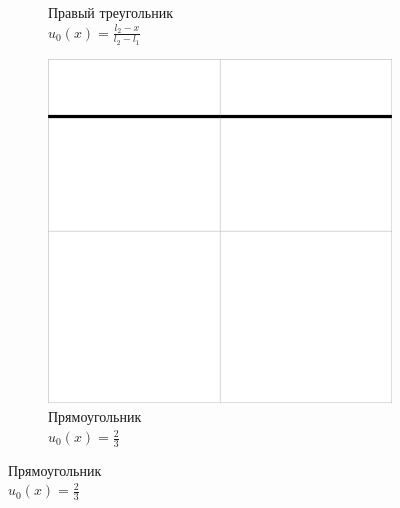 \documentclass[12pt, a4paper]{article}
\begin{document}
\begin{figure}[!hp]
\begin{subfigure}[t]{0.32\textwidth}
		\caption{Правый треугольник \\ $u_0(x) = \frac{l_2-x}{l_2-l_1}$}
		\label{test2}
	\end{subfigure}
	\hfill
	\begin{subfigure}[t]{0.32\textwidth}
		\centering
		\includegraphics[width=\textwidth]{test3}
		\caption{Прямоугольник \\ $u_0(x) = \frac{2}{3}$}
		\label{test3}
	\end{subfigure}
	
	\vspace{1em}
	

\end{figure}
\end{document}
